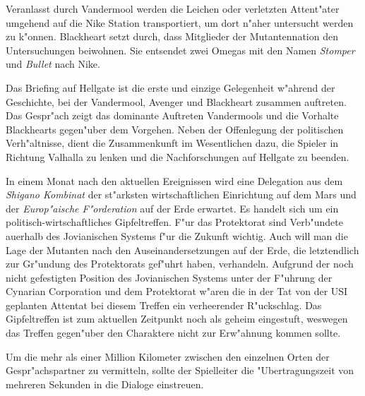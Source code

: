Veranlasst durch Vandermool werden die Leichen oder verletzten Attent"ater umgehend auf die Nike Station transportiert, um dort n"aher untersucht werden zu k"onnen. Blackheart setzt durch, dass Mitglieder der Mutantennation den Untersuchungen beiwohnen. Sie entsendet zwei Omegas mit den Namen \emph{Stomper} und \emph{Bullet} nach Nike.

\begin{remarks}
	Das Briefing auf Hellgate ist die erste und einzige Gelegenheit w"ahrend der Geschichte, bei der Vandermool, Avenger und Blackheart zusammen auftreten. Das Gespr"ach zeigt das dominante Auftreten Vandermools und die Vorhalte Blackhearts gegen"uber dem Vorgehen. Neben der Offenlegung der politischen Verh"altnisse, dient die Zusammenkunft im Wesentlichen dazu, die Spieler in Richtung Valhalla zu lenken und die Nachforschungen auf Hellgate zu beenden.

	In einem Monat nach den aktuellen Ereignissen wird eine Delegation aus dem \emph{Shigano Kombinat} der st"arksten wirtschaftlichen Einrichtung auf dem Mars und der \emph{Europ"aische F"orderation} auf der Erde erwartet. Es handelt sich um ein politisch-wirtschaftliches Gipfeltreffen. F"ur das Protektorat sind Verb"undete au\3erhalb des Jovianischen Systems f"ur die Zukunft wichtig. Auch will man die Lage der Mutanten nach den Auseinandersetzungen auf der Erde, die letztendlich zur Gr"undung des Protektorats gef"uhrt haben, verhandeln. Aufgrund der noch nicht gefestigten Position des Jovianischen Systems unter der F"uhrung der Cynarian Corporation und dem Protektorat w"aren die in der Tat von der USI geplanten Attentat bei diesem Treffen ein verheerender R"uckschlag. Das Gipfeltreffen ist zum aktuellen Zeitpunkt noch als geheim eingestuft, weswegen das Treffen gegen"uber den Charaktere nicht zur Erw"ahnung kommen sollte.

	Um die mehr als einer Million Kilometer zwischen den einzelnen Orten der Gespr"achspartner zu vermitteln, sollte der Spielleiter die "Ubertragungszeit von mehreren Sekunden in die Dialoge einstreuen.
\end{remarks}
